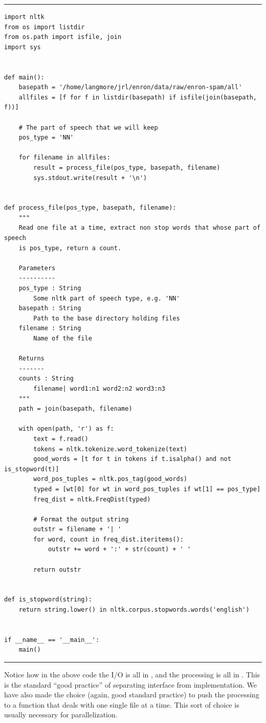 \rule{\textwidth}{2pt}
\begin{verbatim}
import nltk
from os import listdir
from os.path import isfile, join
import sys


def main():
    basepath = '/home/langmore/jrl/enron/data/raw/enron-spam/all'
    allfiles = [f for f in listdir(basepath) if isfile(join(basepath, f))]

    # The part of speech that we will keep
    pos_type = 'NN'

    for filename in allfiles:
        result = process_file(pos_type, basepath, filename)
        sys.stdout.write(result + '\n')


def process_file(pos_type, basepath, filename):
    """
    Read one file at a time, extract non stop words that whose part of speech
    is pos_type, return a count.

    Parameters
    ----------
    pos_type : String
        Some nltk part of speech type, e.g. 'NN'
    basepath : String
        Path to the base directory holding files
    filename : String
        Name of the file

    Returns
    -------
    counts : String
        filename| word1:n1 word2:n2 word3:n3
    """
    path = join(basepath, filename)

    with open(path, 'r') as f:
        text = f.read()
        tokens = nltk.tokenize.word_tokenize(text)
        good_words = [t for t in tokens if t.isalpha() and not is_stopword(t)]
        word_pos_tuples = nltk.pos_tag(good_words)
        typed = [wt[0] for wt in word_pos_tuples if wt[1] == pos_type]
        freq_dist = nltk.FreqDist(typed)

        # Format the output string
        outstr = filename + '| '
        for word, count in freq_dist.iteritems():
            outstr += word + ':' + str(count) + ' '

        return outstr


def is_stopword(string):
    return string.lower() in nltk.corpus.stopwords.words('english')


if __name__ == '__main__':
    main()
\end{verbatim}
\rule{\textwidth}{2pt}
Notice how in the above code the I/O is all in , and the processing is all in .  This is the standard ``good practice'' of separating interface from implementation.  We have also made the choice (again, good standard practice) to push the processing to a function that deals with one single file at a time.  This sort of choice is usually necessary for parallelization.

